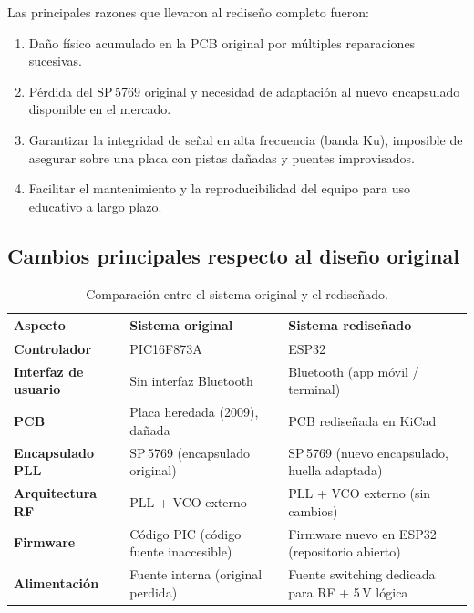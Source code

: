 \documentclass[12pt, a4paper]{article}
\begin{document}
	Las principales razones que llevaron al rediseño completo fueron:
	
	\begin{enumerate}[leftmargin=*, label=\textbf{\arabic*.}]
		\item Daño físico acumulado en la PCB original por múltiples reparaciones sucesivas.
		\item Pérdida del SP\,5769 original y necesidad de adaptación al nuevo encapsulado disponible en
		el mercado.
		\item Garantizar la integridad de señal en alta frecuencia (banda Ku), imposible de asegurar sobre
		una placa con pistas dañadas y puentes improvisados.
		\item Facilitar el mantenimiento y la reproducibilidad del equipo para uso educativo a largo plazo.
	\end{enumerate}
	
	\subsection{Cambios principales respecto al diseño original}
	
	\begin{table}[H]
		\centering
		\caption{Comparación entre el sistema original y el rediseñado.}
		\label{tab:comparacion}
		\renewcommand{\arraystretch}{1.3}
		\begin{tabular}{>{\bfseries}p{4cm} p{5cm} p{5cm}}
			\toprule
			\textbf{Aspecto} & \textbf{Sistema original} & \textbf{Sistema rediseñado} \\
			\midrule
			Controlador        & PIC16F873A                     & ESP32 \\
			Interfaz de usuario & Sin interfaz Bluetooth        & Bluetooth (app móvil / terminal) \\
			PCB                & Placa heredada (2009), dañada  & PCB rediseñada en KiCad \\
			Encapsulado PLL    & SP\,5769 (encapsulado original) & SP\,5769 (nuevo encapsulado, huella adaptada) \\
			Arquitectura RF    & PLL + VCO externo              & PLL + VCO externo (sin cambios) \\
			Firmware           & Código PIC (código fuente inaccesible) & Firmware nuevo en ESP32 (repositorio abierto) \\
			Alimentación       & Fuente interna (original perdida) & Fuente switching dedicada para RF + 5\,V lógica \\
			\bottomrule
		\end{tabular}
	\end{table}
	
\end{document}
